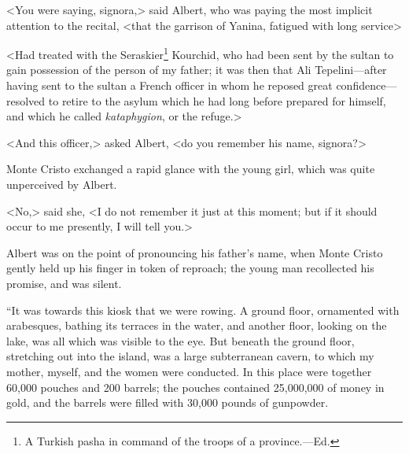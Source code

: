  <You were saying, signora,> said Albert, who was paying the most implicit attention to the recital, <that the garrison of Yanina, fatigued with long service\longdash> 

 <Had treated with the Seraskier\footnote{A Turkish pasha in command of the troops of a province.—Ed. } Kourchid, who had been sent by the sultan to gain possession of the person of my father; it was then that Ali Tepelini—after having sent to the sultan a French officer in whom he reposed great confidence—resolved to retire to the asylum which he had long before prepared for himself, and which he called \textit{kataphygion}, or the refuge.> 

 <And this officer,> asked Albert, <do you remember his name, signora?> 

 Monte Cristo exchanged a rapid glance with the young girl, which was quite unperceived by Albert. 

 <No,> said she, <I do not remember it just at this moment; but if it should occur to me presently, I will tell you.> 

 Albert was on the point of pronouncing his father's name, when Monte Cristo gently held up his finger in token of reproach; the young man recollected his promise, and was silent. 

 “It was towards this kiosk that we were rowing. A ground floor, ornamented with arabesques, bathing its terraces in the water, and another floor, looking on the lake, was all which was visible to the eye. But beneath the ground floor, stretching out into the island, was a large subterranean cavern, to which my mother, myself, and the women were conducted. In this place were together 60,000 pouches and 200 barrels; the pouches contained 25,000,000 of money in gold, and the barrels were filled with 30,000 pounds of gunpowder. 

